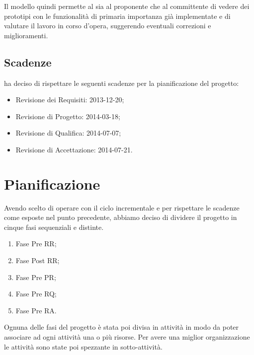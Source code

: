 Il modello quindi permette al sia al proponente che al committente di vedere dei prototipi con le funzionalità di primaria importanza già implementate e di valutare il lavoro in corso d'opera, suggerendo eventuali correzioni e miglioramenti.


\subsection{Scadenze}
\label{2.6}
\NomeGruppo{} ha deciso di rispettare le seguenti scadenze per la pianificazione del progetto:
\begin{itemize}
\item Revisione dei Requisiti: 2013-12-20;
\item Revisione di Progetto:  2014-03-18;
\item Revisione di Qualifica: 2014-07-07;
\item Revisione di Accettazione: 2014-07-21.
\end{itemize}

\newpage
\section{Pianificazione}
\label{3.0}
Avendo scelto di operare con il ciclo incrementale e per rispettare le scadenze come esposte nel punto precedente, abbiamo deciso di dividere il progetto in cinque fasi sequenziali e distinte.

\begin{enumerate}
\item Fase Pre RR;
\item Fase Post RR;
\item Fase Pre PR;
\item Fase Pre RQ;
\item Fase Pre RA.
\end{enumerate}

Ognuna delle fasi del progetto è stata poi divisa in attività in modo da poter associare ad ogni attività una o più risorse. Per avere una miglior organizzazione le attività sono state poi spezzante in sotto-attività.



\newpage


\newpage


\newpage


\newpage


\newpage


